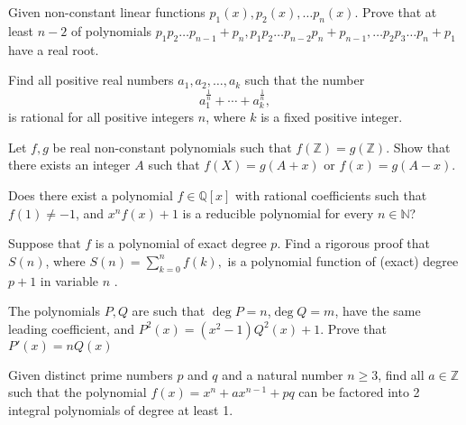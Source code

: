 \begin{question}
Given non-constant linear functions $p_1(x), p_2(x), \dots p_n(x)$. Prove that at least $n-2$ of polynomials $p_1p_2\dots p_{n-1}+p_n,  p_1p_2\dots p_{n-2} p_n + p_{n-1},\dots p_2p_3\dots p_n+p_1$ have a real root.
\end{question}



\begin{question}
Find all positive real numbers $a_1,a_2,\ldots,a_k$ such that the number \[ a_1^{\frac{1}{n}}+\cdots+a_k^{\frac{1}{n}},\] is rational for all positive integers $n$, where $k$ is a fixed positive integer.
\end{question}



\begin{question}
Let $f,g$ be real non-constant polynomials such that $ f(\mathbb Z)=g(\mathbb Z) $. Show that there exists an integer $A$ such that $ f(X)=g(A+x) $ or $ f(x)=g(A-x) $. 
\end{question}


\begin{question}
Does there exist a polynomial $f \in \mathbb{Q}[x]$ with rational coefficients such that $f(1) \neq -1$, and $x^nf(x) + 1$ is a reducible polynomial for every $n \in \mathbb{N}$?
\end{question}



\begin{question}
Suppose that  $ f $ is a polynomial of exact degree  $ p.$ Find a rigorous proof that $ S(n) $,  where  $ S(n)= \sum\limits_{k=0}^{n}f(k) , $  is a polynomial function  of (exact) degree  $ p+1 $ in variable $n $ .
\end{question}






\begin{question}
The polynomials $P,Q$ are such that $\deg P=n$,$\deg Q=m$, have the same leading coefficient, and $P^2(x)=(x^2-1)Q^2(x)+1$. Prove that $P'(x)=nQ(x)$
\end{question}





\begin{question}
Given distinct prime numbers $p$ and $q$ and a natural number $n \geq 3$, find all $a \in \mathbb{Z}$ such that the polynomial $f(x) = x^n + ax^{n-1} + pq$ can be factored into 2 integral polynomials of degree at least 1.
\end{question}





